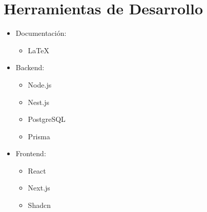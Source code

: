 	\section{Herramientas de Desarrollo}
	\begin{itemize}
		\item Documentación:
		\begin{itemize}
			\item LaTeX
		\end{itemize}
		\item Backend:
		\begin{itemize}
			\item Node.js
			\item Nest.js
			\item PostgreSQL
			\item Prisma
		\end{itemize}

		\item Frontend:
		\begin{itemize}
			\item React
			\item Next.js
			\item Shadcn
		\end{itemize}
	\end{itemize}
